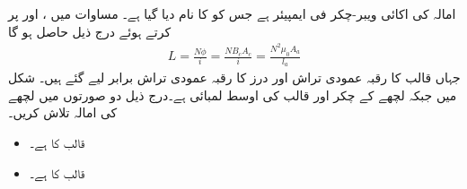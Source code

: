 امالہ کی اکائی ویبر-چکر فی ایمپیئر ہے جس کو   کا نام دیا گیا ہے۔ مساوات  میں ،    اور  پر کرتے ہوئے درج ذیل حاصل ہو گا
\begin{align}
L=\frac{N \phi}{i}=\frac{N B_c A_c}{i}=\frac{N^2 \mu_0 A_a}{l_a}
\end{align}
جہاں قالب کا رقبہ عمودی تراش  اور درز کا رقبہ عمودی تراش  برابر لیے گئے ہیں۔
%
شکل  میں  جبکہ لچھے کے  چکر اور قالب کی اوسط لمبائی  ہے۔درج ذیل دو صورتوں میں لچھے کی امالہ تلاش کریں۔
\begin{itemize}
\item
قالب کا  ہے۔
\item
قالب کا  ہے۔
\end{itemize}

